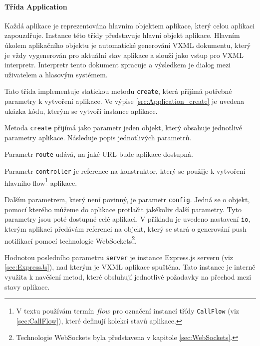 \documentclass[ing,male,java,dept460]{diploma}						%
\begin{document}


\paragraph{Třída Application}
\label{sec:Application}
Každá aplikace je reprezentována hlavním objektem aplikace, který celou aplikaci zapouzdřuje. Instance této třídy představuje hlavní objekt aplikace. Hlavním úkolem aplikačního objektu je automatické generování VXML dokumentu, který je vždy vygenerován pro aktuální stav aplikace a slouží jako vstup pro VXML interpretr. Interpretr tento dokument zpracuje a výsledkem je dialog mezi uživatelem a hlasovým systémem.

Tato třída implementuje statickou metodu \texttt{create}, která přijímá potřebné parametry k vytvoření aplikace. Ve výpise \ref{src:Application_create} je uvedena ukázka kódu, kterým se vytvoří instance aplikace.



Metoda \texttt{create} přijímá jako parametr jeden objekt, který obsahuje jednotlivé parametry aplikace. Následuje popis jednotlivých parametrů.

Parametr \texttt{route} udává, na jaké URL bude aplikace dostupná.

Parametr \texttt{controller} je reference na konstruktor, který se použije k vytvoření hlavního flow\footnote{V textu používám termín $flow$ pro označení instancí třídy \texttt{CallFlow} (viz \ref{sec:CallFlow}), které definují kolekci stavů aplikace.} aplikace.

Dalším parametrem, který není povinný, je parametr \texttt{config}. Jedná se o objekt, pomocí kterého můžeme do aplikace protlačit jakékoliv další parametry. Tyto parametry jsou poté dostupné celé aplikaci. V příkladu je uvedeno nastavení \texttt{io}, kterým aplikaci předávám referenci na objekt, který se stará o generování push notifikací pomocí technologie WebSockets\footnote{Technologie WebSockets byla představena v kapitole \ref{sec:WebSockets}.}.

Hodnotou posledního parametru \texttt{server} je instance Express.js serveru (viz \ref{sec:ExpressJs}), nad kterým je VXML aplikace spuštěna. Tato instance je interně využita k navěšení metod, které obsluhují jednotlivé požadavky na přechod mezi stavy aplikace.
\end{document}
